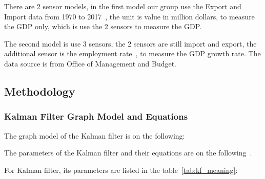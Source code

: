 \documentclass[11pt, a4paper]{article}
\begin{document}
There are 2 sensor models, in the first model our group use the Export and Import data from 1970 to 2017~\cite{ref:source2}, the unit is value in million dollars, to measure the GDP only, which is use the 2 sensors to measure the GDP. 

The second model is use 3 sensors, the 2 sensors are still import and export, the additional sensor is the employment rate~\cite{ref:source3}, to measure the GDP growth rate. The data source is from Office of Management and Budget. 

\subsection{Methodology}

\subsubsection{Kalman Filter Graph Model and Equations}
The graph model of the Kalman filter is on the following:



The parameters of the Kalman filter and their equations are on the following~\cite{ref:kf}.

For Kalman filter, its parameters are listed in the table~\ref{tab:kf_meaning}:
\end{document}
